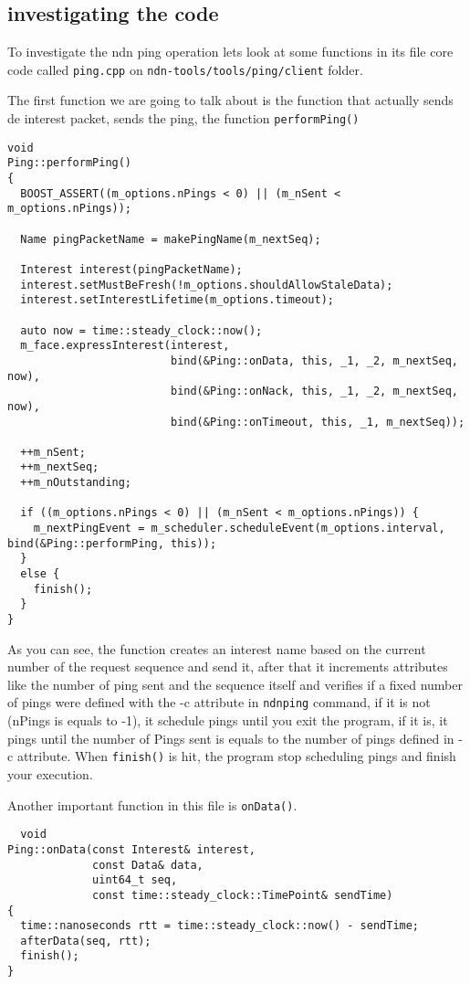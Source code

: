 \documentclass[10pt,letterpaper,extrafontsizes]{memoir}
\begin{document}
\subsection{investigating the code}
To investigate the ndn ping operation lets look at some functions in its file core code called \texttt{ping.cpp} on \texttt{ndn-tools/tools/ping/client} folder. \par The first function we are going to talk about is the function that actually sends de interest packet, sends the ping, the function \texttt{performPing()}
\clearpage
\begin{lstlisting}
void
Ping::performPing()
{
  BOOST_ASSERT((m_options.nPings < 0) || (m_nSent < m_options.nPings));

  Name pingPacketName = makePingName(m_nextSeq);

  Interest interest(pingPacketName);
  interest.setMustBeFresh(!m_options.shouldAllowStaleData);
  interest.setInterestLifetime(m_options.timeout);

  auto now = time::steady_clock::now();
  m_face.expressInterest(interest,
                         bind(&Ping::onData, this, _1, _2, m_nextSeq, now),
                         bind(&Ping::onNack, this, _1, _2, m_nextSeq, now),
                         bind(&Ping::onTimeout, this, _1, m_nextSeq));

  ++m_nSent;
  ++m_nextSeq;
  ++m_nOutstanding;

  if ((m_options.nPings < 0) || (m_nSent < m_options.nPings)) {
    m_nextPingEvent = m_scheduler.scheduleEvent(m_options.interval, bind(&Ping::performPing, this));
  }
  else {
    finish();
  }
}

\end{lstlisting}
As you can see, the function creates an interest name based on the current number of the request sequence and send it, after that it increments attributes like the number of ping sent and the sequence itself and verifies if a fixed number of pings were defined with the -c attribute in \texttt{ndnping} command, if it is not (nPings is equals to -1), it schedule pings until you exit the program, if it is, it pings until the number of Pings sent is equals to the number of pings defined in -c attribute. When \texttt{finish()} is hit, the program stop scheduling pings and finish your execution.\par
Another important function in this file is \texttt{onData()}.
\begin{lstlisting}
  void
Ping::onData(const Interest& interest,
             const Data& data,
             uint64_t seq,
             const time::steady_clock::TimePoint& sendTime)
{
  time::nanoseconds rtt = time::steady_clock::now() - sendTime;
  afterData(seq, rtt);
  finish();
}
\end{lstlisting}
\end{document}
